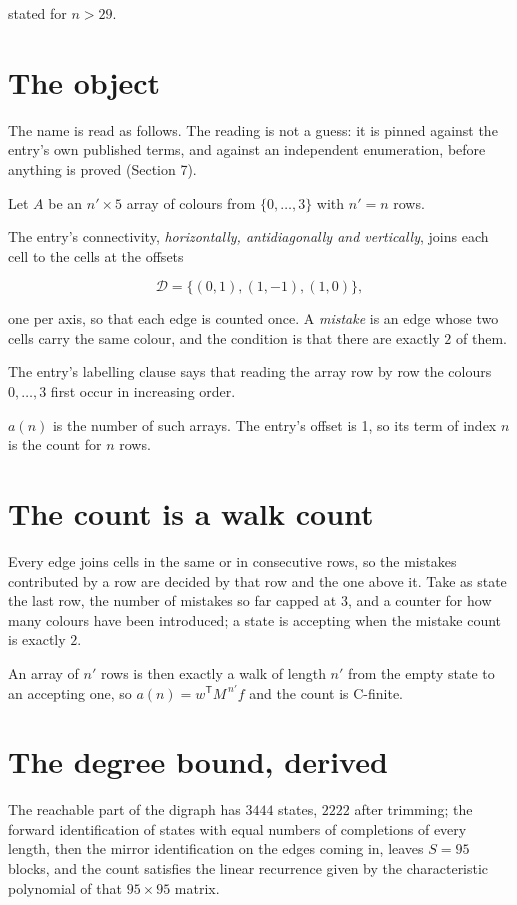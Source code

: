 \documentclass[11pt]{article}
\theoremstyle{definition}
\begin{document}
stated for $n > 29$.

\section{The object}

The name is read as follows. The reading is not a guess: it is pinned against the entry's own published terms, and against an independent enumeration, before anything is proved (Section 7).

Let $A$ be an $n' \times 5$ array of colours from $\{0,\dots,3\}$ with $n' = n$ rows.

The entry's connectivity, {\itshape horizontally, antidiagonally and vertically}, joins each cell to the cells at the offsets

\[\mathcal{D} = \{(0,1), (1,-1), (1,0)\},\]

one per axis, so that each edge is counted once. A {\itshape mistake} is an edge whose two cells carry the same colour, and the condition is that there are exactly $2$ of them.

The entry's labelling clause says that reading the array row by row the colours $0,\dots,3$ first occur in increasing order.

$a(n)$ is the number of such arrays. The entry's offset is 1, so its term of index $n$ is the count for $n$ rows.

\section{The count is a walk count}

Every edge joins cells in the same or in consecutive rows, so the mistakes contributed by a row are decided by that row and the one above it. Take as state the last row, the number of mistakes so far capped at $3$, and a counter for how many colours have been introduced; a state is accepting when the mistake count is exactly $2$.

An array of $n'$ rows is then exactly a walk of length $n'$ from the empty state to an accepting one, so $a(n) = w^{\mathsf T}M^{\,n'}f$ and the count is C-finite.

\section{The degree bound, derived}

The reachable part of the digraph has $3444$ states, $2222$ after trimming; the forward identification of states with equal numbers of completions of every length, then the mirror identification on the edges coming in, leaves $S = 95$ blocks, and the count satisfies the linear recurrence given by the characteristic polynomial of that $95\times95$ matrix.
\end{document}
